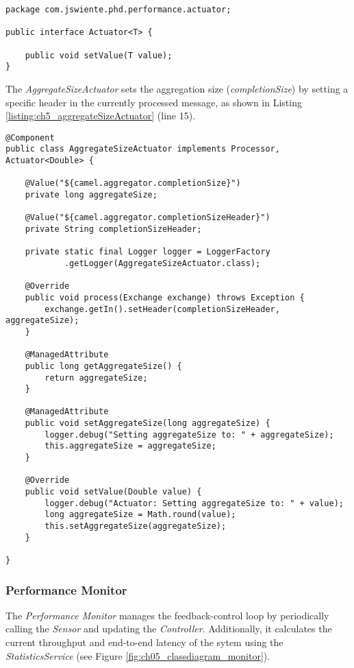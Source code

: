 \begin{lstlisting}[caption={Actuator Interface},label=listing:ch5_actuator_interface]
package com.jswiente.phd.performance.actuator;

public interface Actuator<T> {

	public void setValue(T value);
}
\end{lstlisting}

The \emph{AggregateSizeActuator} sets the aggregation size (\emph{completionSize}) by setting a specific header in the currently processed message, as shown in Listing \ref{listing:ch5_aggregateSizeActuator} (line 15). 

\begin{lstlisting}[caption={AggregateSizeActuator},label=listing:ch5_aggregateSizeActuator]
@Component
public class AggregateSizeActuator implements Processor, Actuator<Double> {

	@Value("${camel.aggregator.completionSize}")
	private long aggregateSize;
	
	@Value("${camel.aggregator.completionSizeHeader}")
	private String completionSizeHeader;
	
	private static final Logger logger = LoggerFactory
			.getLogger(AggregateSizeActuator.class);
	
	@Override
	public void process(Exchange exchange) throws Exception {
		exchange.getIn().setHeader(completionSizeHeader, aggregateSize);
	}

	@ManagedAttribute
	public long getAggregateSize() {
		return aggregateSize;
	}

	@ManagedAttribute
	public void setAggregateSize(long aggregateSize) {
		logger.debug("Setting aggregateSize to: " + aggregateSize);
		this.aggregateSize = aggregateSize;
	}

	@Override
	public void setValue(Double value) {
		logger.debug("Actuator: Setting aggregateSize to: " + value);
		long aggregateSize = Math.round(value);
		this.setAggregateSize(aggregateSize);
	}

}

\end{lstlisting}

\subsubsection{Performance Monitor}
The \emph{Performance Monitor} manages the feedback-control loop by periodically calling the \emph{Sensor} and updating the \emph{Controller}. Additionally, it calculates the current throughput and end-to-end latency of the sytem using the \emph{StatisticsService} (see Figure \ref{fig:ch05_classdiagram_monitor}).

